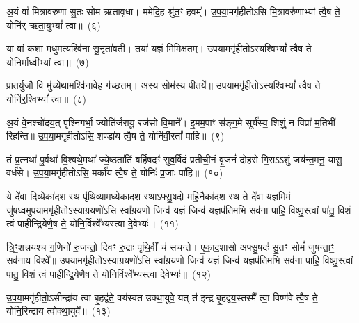 अ॒यं वां᳚ मित्रावरुणा सु॒तः सोम॑ ऋतावृधा। ममेदि॒ह श्रु॑त॒ꣳ॒ हवम्᳚। उ॒प॒या॒मगृ॑हीतो\-ऽसि मि॒त्रावरु॑णाभ्यां त्वै॒ष ते॒ योनि॑र् ऋता॒यु\-भ्यां᳚ त्वा॥~(६)

{\anuvakamend[{अ॒यं वां᳚ विꣳश॒तिः}]}%

या वां॒ कशा॒ मधु॑म॒त्यश्वि॑ना सू॒नृता॑वती। तया॑ य॒ज्ञं मि॑मिक्षतम्। उ॒प॒या॒मगृ॑हीतो\-ऽस्य॒श्वि\-भ्यां᳚ त्वै॒ष ते॒ योनि॒र्माध्वी᳚भ्यां त्वा॥~(७)

{\anuvakamend[{या वा॑म॒ष्टाद॑श}]}%

प्रा॒त॒र्युजौ॒ वि मु॑च्येथा॒मश्वि॑ना॒वेह ग॑च्छतम्। अ॒स्य सोम॑स्य पी॒तये᳚॥ उ॒प॒या॒मगृ॑हीतो\-ऽस्य॒श्वि\-भ्यां᳚ त्वै॒ष ते॒ योनि॑र॒श्वि\-भ्यां᳚ त्वा॥~(८)

{\anuvakamend[{प्रा॒त॒र्युजा॒वेका॒न्नविꣳ॑शतिः}]}%

अ॒यं वे॒नश्चो॑दय॒त् पृश्नि॑गर्भा॒ ज्योति॑र्जरायू॒ रज॑सो वि॒माने᳚। इ॒मम॒पाꣳ स॑ङ्ग॒मे सूर्य॑स्य॒ शिशुं॒ न विप्रा॑ म॒तिभी॑ रिहन्ति॥ उ॒प॒या॒मगृ॑हीतो\-ऽसि॒ शण्डा॑य त्वै॒ष ते॒ योनि॑र्वी॒रतां᳚ पाहि॥~(९)

{\anuvakamend[{अ॒यं वे॒नः पञ्च॑विꣳशतिः}]}%

तं प्र॒त्नथा॑ पू॒र्वथा॑ वि॒श्वथे॒मथा᳚ ज्ये॒ष्ठता॑तिं बर्\mbox{}हि॒षदꣳ॑ सुव॒र्विदं॑ प्रतीची॒नं वृ॒जनं॑ दोहसे गि॒रा\-ऽ\-ऽशुं जय॑न्त॒मनु॒ यासु॒ वर्ध॑से। उ॒प॒या॒मगृ॑हीतो\-ऽसि॒ मर्का॑य त्वै॒ष ते॒ योनिः॑ प्र॒जाः पा॑हि॥~(१०)

{\anuvakamend[{तꣳ षड्विꣳ॑शतिः}]}%

ये दे॑वा दि॒व्येका॑\-दश॒ स्थ पृ॑थि॒व्यामध्येका॑\-दश॒ स्था\-ऽफ्सु॒षदो॑ महि॒नैका॑\-दश॒ स्थ ते दे॑वा य॒ज्ञमि॒मं जु॑षध्वमुपया॒मगृ॑हीतो\-ऽस्याग्रय॒णो॑\-ऽसि॒ स्वा᳚ग्रयणो॒ जिन्व॑ य॒ज्ञं जिन्व॑ य॒ज्ञप॑तिम॒भि सव॑ना पाहि॒ विष्णु॒स्त्वां पा॑तु॒ विशं॒ त्वं पा॑हीन्द्रि॒येणै॒ष ते॒ योनि॒र्विश्वे᳚भ्यस्त्वा दे॒वेभ्यः॑॥~(११)

{\anuvakamend[{ये दे॑वा॒स्त्रिच॑त्वारिꣳशत्}]}%

त्रि॒ꣳ॒शत्त्रय॑श्च ग॒णिनो॑ रु॒जन्तो॒ दिवꣳ॑ रु॒द्राः पृ॑थि॒वीं च॑ सचन्ते। ए॒का॒द॒शासो॑ अफ्सु॒षदः॑ सु॒तꣳ सोमं॑ जुषन्ता॒ꣳ॒ सव॑नाय॒ विश्वे᳚॥ उ॒प॒या॒मगृ॑हीतो\-ऽस्याग्रय॒णो॑\-ऽसि॒ स्वा᳚ग्रयणो॒ जिन्व॑ य॒ज्ञं जिन्व॑ य॒ज्ञप॑तिम॒भि सव॑ना पाहि॒ विष्णु॒स्त्वां पा॑तु॒ विशं॒ त्वं पा॑हीन्द्रि॒येणै॒ष ते॒ योनि॒र्विश्वे᳚भ्यस्त्वा दे॒वेभ्यः॑॥~(१२)

{\anuvakamend[{त्रि॒ꣳ॒शद् द्विच॑त्वारिꣳशत्}]}%

उ॒प॒या॒मगृ॑हीतो॒\-ऽसीन्द्रा॑य त्वा बृ॒हद्व॑ते॒ वय॑स्वत उक्था॒युवे॒ यत् त॑ इन्द्र बृ॒हद्वय॒स्तस्मै᳚ त्वा॒ विष्ण॑वे त्वै॒ष ते॒ योनि॒रिन्द्रा॑य त्वोक्था॒युवे᳚॥~(१३)


